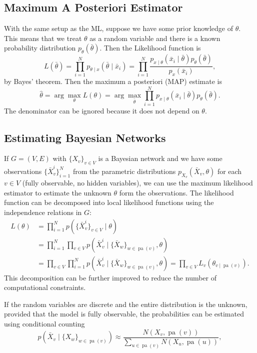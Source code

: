 \documentclass[a4paper]{article}
\newcommand{\given}{\mid}
\DeclareMathOperator{\pa}{pa} %
\theoremstyle{plain}
\theoremstyle{definition}
\theoremstyle{remark}
\begin{document}
\subsection{Maximum A Posteriori Estimator}

With the same setup as the ML, suppose we have some prior knowledge of
$\theta$. This means that we treat $\theta$ as a random variable and there is
a known probability distribution $p_\theta(\bar{\theta})$. Then the Likelihood
function is
\[
  L(\bar{\theta}) = \prod_{i=1}^N
    p_{\theta \given x}(\bar{\theta} \given \bar{x}_i)
    = \prod_{i=1}^N \frac{
        p_{x \given \theta}(\bar{x}_i \given \bar{\theta})
        p_\theta(\bar{\theta})
      }{p_x(\bar{x}_i)},
\]
by Bayes' theorem. Then the maximum a posteriori (MAP) estimate is
\[
  \hat{\theta} = \arg \max_\theta L(\theta)
    = \arg \max_{\bar{\theta}} \prod_{i=1}^N
        p_{x \given \theta}(\bar{x}_i \given \bar{\theta})
        p_\theta(\bar{\theta}).
\]
The denominator can be ignored because it does not depend on $\theta$.


\subsection{Estimating Bayesian Networks}

If $G = (V,E)$ with $\{X_v\}_{v \in V}$ is a Bayesian network and we have some
observations $\{\bar{X}_v^i\}_{i=1}^N$ from the parametric distributions
$p_{X_v}(\bar{X}_v, \theta)$ for each $v \in V$ (fully observable, no hidden
variables), we can use the maximum likelihood estimator to estimate the
unknown $\theta$ form the observations. The likelihood function can be
decomposed into local likelihood functions using the independence relations in
$G$:
\begin{align*}
  L(\theta) &= \prod_{i=1}^N p(\{\bar{X}_v^i\}_{v \in V} \given \theta) \\
    &= \prod_{i=1}^N \prod_{v \in V}  p(
      \bar{X}_v^i \given
      \{\bar{X}_w\}_{w \in \pa(v)}, \theta) \\
    &= \prod_{v \in V} \prod_{i=1}^N
        p(\bar{X}_v^i \given \{\bar{X}_w\}_{w \in \pa(v)}, \theta) 
    = \prod_{v \in V} L_v(\theta_{v \given \pa(v)}).
\end{align*}
This decomposition can be further improved to reduce the number of
computational constraints.

If the random variables are discrete and the entire distribution is the
unknown, provided that the model is fully observable, the probabilities can be
estimated using conditional counting
\[
  p(\bar{X}_v \given \{X_w\}_{w \in \pa(v)}) \approx
    \frac{N(X_v, \pa(v))}{\sum_{u \in \pa(v)} N(X_u, \pa(u))},
\]
\end{document}
